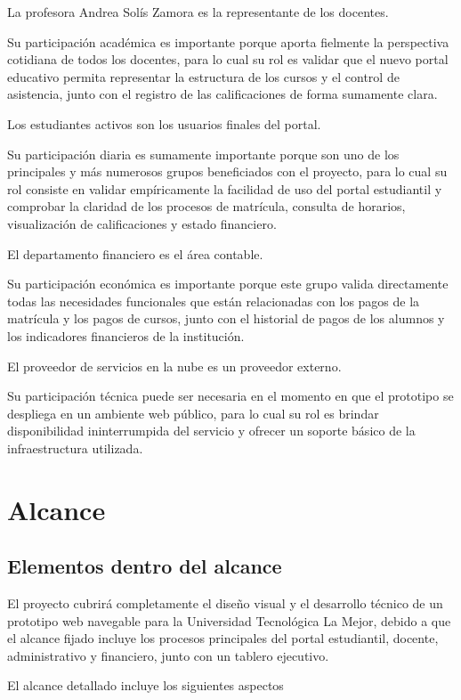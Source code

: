 \documentclass[11pt,spanish]{article}
\begin{document}
La profesora Andrea Solís Zamora es la representante de los docentes.

Su participación académica es importante porque aporta fielmente la perspectiva cotidiana de todos los docentes, para lo cual su rol es validar que el nuevo portal educativo permita representar la estructura de los cursos y el control de asistencia, junto con el registro de las calificaciones de forma sumamente clara.

Los estudiantes activos son los usuarios finales del portal.

Su participación diaria es sumamente importante porque son uno de los principales y más numerosos grupos beneficiados con el proyecto, para lo cual su rol consiste en validar empíricamente la facilidad de uso del portal estudiantil y comprobar la claridad de los procesos de matrícula, consulta de horarios, visualización de calificaciones y estado financiero.

El departamento financiero es el área contable.

Su participación económica es importante porque este grupo valida directamente todas las necesidades funcionales que están relacionadas con los pagos de la matrícula y los pagos de cursos, junto con el historial de pagos de los alumnos y los indicadores financieros de la institución.

El proveedor de servicios en la nube es un proveedor externo.

Su participación técnica puede ser necesaria en el momento en que el prototipo se despliega en un ambiente web público, para lo cual su rol es brindar disponibilidad ininterrumpida del servicio y ofrecer un soporte básico de la infraestructura utilizada.

\section{Alcance}

\subsection{Elementos dentro del alcance}

El proyecto cubrirá completamente el diseño visual y el desarrollo técnico de un prototipo web navegable para la Universidad Tecnológica La Mejor, debido a que el alcance fijado incluye los procesos principales del portal estudiantil, docente, administrativo y financiero, junto con un tablero ejecutivo.

El alcance detallado incluye los siguientes aspectos
\end{document}
